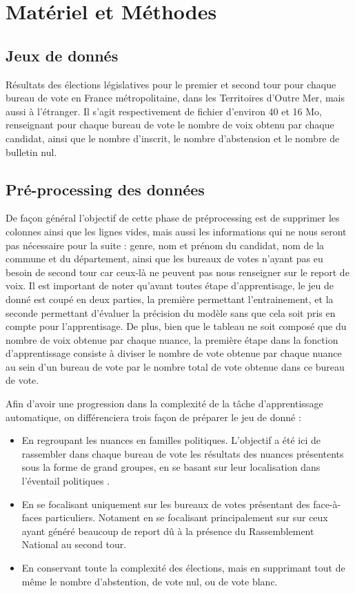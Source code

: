 \documentclass[11pt]{article}
\begin{document}
    \newpage
    \section{Matériel et Méthodes}

        \subsection*{Jeux de donnés}
            Résultats des élections législatives pour le premier et second tour pour chaque bureau de vote en France métropolitaine, dans les Territoires d'Outre Mer, mais aussi à  l'étranger. Il s'agit respectivement de fichier d'environ 40 et 16 Mo, renseignant pour chaque bureau de vote le nombre de voix obtenu par chaque candidat, ainsi que le nombre d'inscrit, le nombre d'abstension et le nombre de bulletin nul.
        
        \subsection*{Pré-processing des données}
            De façon général l'objectif de cette phase de préprocessing est de supprimer les colonnes ainsi que les lignes vides, mais aussi les informations qui ne nous seront pas nécessaire pour la suite : genre, nom et prénom du candidat, nom de la commune et du département, ainsi que les bureaux de votes n'ayant pas eu besoin de second tour car ceux-là ne peuvent pas nous renseigner sur le report de voix. Il est important de noter qu'avant toutes étape d'apprentisage, le jeu de donné est coupé en deux parties, la première permettant l'entrainement, et la seconde permettant d'évaluer la précision du modèle sans que cela soit pris en compte pour l'apprentisage. De plus, bien que le tableau ne soit composé que du nombre de voix obtenue par chaque nuance, la première étape dans la fonction d'apprentissage consiste à diviser le nombre de vote obtenue par chaque nuance au sein d'un bureau de vote par le nombre total de vote obtenue dans ce bureau de vote.

            Afin d'avoir une progression dans la complexité de la tâche d'apprentissage automatique, on différenciera trois façon de préparer le jeu de donné :
            \begin{itemize}
                \item En regroupant les nuances en familles politiques. L'objectif a été ici de rassembler dans chaque bureau de vote les résultats des nuances présentents sous la forme de grand groupes, en se basant sur leur localisation dans l'éventail politiques \cite{Wikipédia_2024b}.
                \item En se focalisant uniquement sur les bureaux de votes présentant des face-à-faces particuliers. Notament en se focalisant principalement sur sur ceux ayant généré beaucoup de report dû à la présence du Rassemblement National au second tour.
                \item En conservant toute la complexité des élections, mais en supprimant tout de même le nombre d'abstention, de vote nul, ou de vote blanc.
            \end{itemize}
\end{document}
